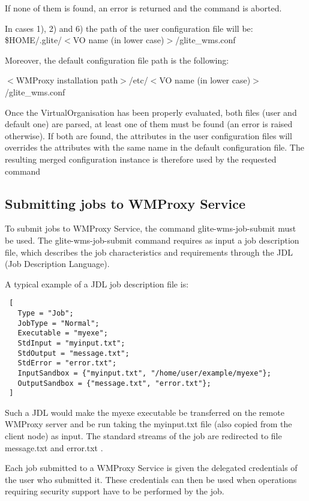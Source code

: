  If none of them is found, an error is returned and the command is aborted.

 In cases 1), 2) and 6) the path of the user configuration file will be:  \$HOME/.glite/$<$VO name (in lower case)$>$/glite\_wms.conf

 Moreover, the default configuration file path is the following:

 $<$WMProxy installation path$>$/etc/$<$VO name (in lower case)$>$/glite\_wms.conf

 Once the VirtualOrganisation has been properly evaluated, both files (user and default one) are parsed, at least one of them must be found (an error is raised otherwise). If both are found, the attributes in the user configuration files will overrides the attributes with the same name in the default configuration file. The resulting merged configuration instance is therefore used by the requested command


\subsection{Submitting jobs to WMProxy Service}

To submit jobs to WMProxy Service, the command glite-wms-job-submit
must be used. The glite-wms-job-submit command requires as input a
job description file, which describes the job characteristics and requirements
through the JDL (Job Description Language).
                                                                                   
A typical example of a JDL job description file is:


\smallskip
\begin{verbatim}
 [
   Type = "Job";
   JobType = "Normal";
   Executable = "myexe";
   StdInput = "myinput.txt";
   StdOutput = "message.txt";
   StdError = "error.txt";
   InputSandbox = {"myinput.txt", "/home/user/example/myexe"};
   OutputSandbox = {"message.txt", "error.txt"};
 ]
\end{verbatim}
\smallskip

Such a JDL would make the myexe executable be transferred on the
remote WMProxy server and be run taking the myinput.txt file (also copied
from the client node) as input. The standard streams of the
job are redirected to file message.txt and
error.txt .
\medskip

\bigskip



Each job submitted to a WMProxy Service 
is given the delegated credentials of the user who submitted it.
These credentials can
then be used when operations requiring security support have to be
performed by the job.

